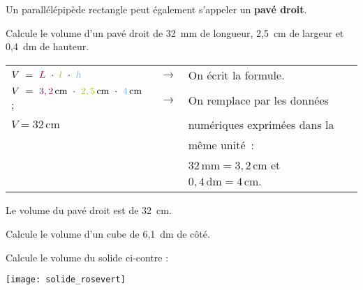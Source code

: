 \begin{methode*1}

 \begin{remarque}
Un parallélépipède rectangle peut également s'appeler un \textbf{pavé droit}.
 \end{remarque}
 
 \begin{exemple*1}
Calcule le volume d'un pavé droit de 32 mm de longueur, 2,5 cm de largeur et 0,4 dm de hauteur. \\[1em]
\begin{tabular}{lll} 
 $V = \textcolor{C1}{L} \cdot \textcolor{H1}{l} \cdot \textcolor{U1}{h}$ & $\longrightarrow$ & On écrit la formule. \\
 $V = \textcolor{C1}{3,2}\,\text{cm} \cdot \textcolor{H1}{2,5}\,\text{cm} \cdot \textcolor{U1}{4}\,\text{cm}$ ; & $\longrightarrow$ & On remplace par les données \\
 $V = 32\,\text{cm}$\up{3} & & numériques exprimées dans la  \\
 & & même unité : \\
 & & $32\,\text{mm} = 3,2\,\text{cm}$ et $0,4\,\text{dm} = 4\,\text{cm}$. \\
 \end{tabular}
 Le volume du pavé droit est de 32 cm.
 \end{exemple*1}


 \exercice  
Calcule le volume d'un cube de 6,1 dm de côté.

 \exercice  
\begin{minipage}[c]{0.48\linewidth}
Calcule le volume du solide ci‑contre :
 \end{minipage} \hfill%
 \begin{minipage}[c]{0.28\linewidth}
  \texttt{[image: solide\_rosevert]}
  \end{minipage} \\

 \end{methode*1}
 
